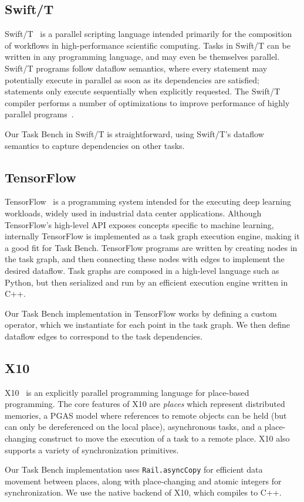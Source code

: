 \subsection{Swift/T}

Swift/T~\cite{Wozniak13} is a parallel scripting language intended
primarily for the composition of workflows in high-performance
scientific computing. Tasks in Swift/T can be written in any
programming language, and may even be themselves parallel. Swift/T
programs follow dataflow semantics, where every statement may
potentially execute in parallel as soon as its dependencies are
satisfied; statements only execute sequentially when explicitly
requested. The Swift/T compiler performs a number of optimizations to
improve performance of highly parallel programs~\cite{Armstrong14}.

Our Task Bench in Swift/T is straightforward, using Swift/T's dataflow
semantics to capture dependencies on other tasks.

\subsection{TensorFlow}

TensorFlow~\cite{TensorFlow15} is a programming system intended for
the executing deep learning workloads, widely used in industrial data
center applications. Although TensorFlow's high-level API exposes
concepts specific to machine learning, internally TensorFlow is
implemented as a task graph execution engine, making it a good fit for
Task Bench. TensorFlow programs are written by creating nodes in the
task graph, and then connecting these nodes with edges to implement
the desired dataflow. Task graphs are composed in a high-level
language such as Python, but then serialized and run by an efficient
execution engine written in C++.

Our Task Bench implementation in TensorFlow works by defining a custom
operator, which we instantiate for each point in the task graph. We
then define dataflow edges to correspond to the task dependencies.

\subsection{X10}

X10~\cite{X1005} is an explicitly parallel programming language for
place-based programming. The core features of X10 are \emph{places}
which represent distributed memories, a PGAS model where references to
remote objects can be held (but can only be dereferenced on the local
place), asynchronous tasks, and a place-changing construct to move the
execution of a task to a remote place. X10 also supports a variety of
synchronization primitives.

Our Task Bench implementation uses
\lstinline[language=X10]{Rail.asyncCopy} for efficient data movement
between places, along with place-changing and atomic integers for
synchronization. We use the native backend of X10, which compiles to
C++.
